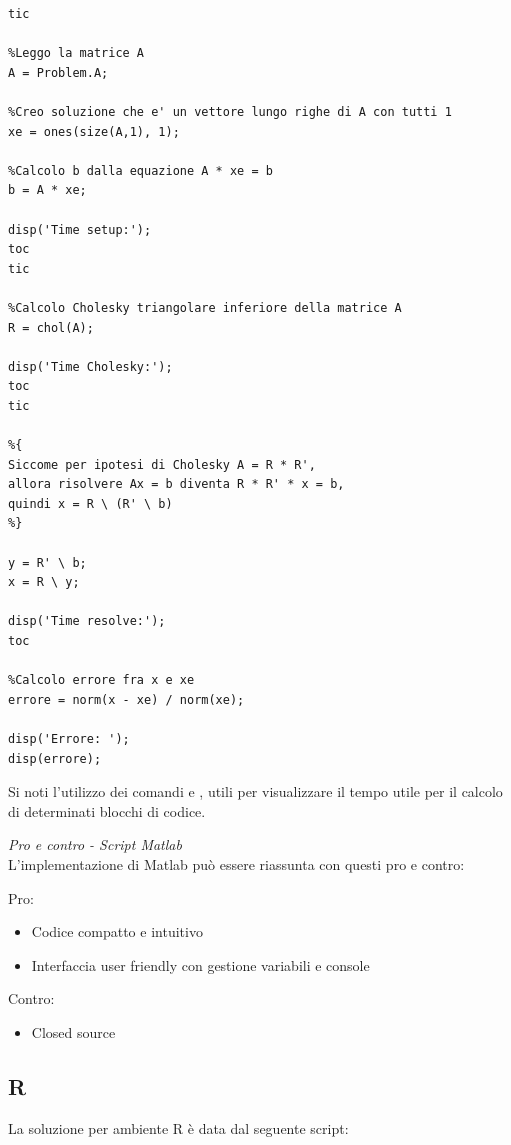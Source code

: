 \documentclass[preprint,12pt]{elsarticle}
\begin{document}
\begin{lstlisting}
tic

%Leggo la matrice A
A = Problem.A;

%Creo soluzione che e' un vettore lungo righe di A con tutti 1
xe = ones(size(A,1), 1);

%Calcolo b dalla equazione A * xe = b
b = A * xe;

disp('Time setup:');
toc
tic

%Calcolo Cholesky triangolare inferiore della matrice A 
R = chol(A);

disp('Time Cholesky:');
toc
tic

%{
Siccome per ipotesi di Cholesky A = R * R',
allora risolvere Ax = b diventa R * R' * x = b,
quindi x = R \ (R' \ b)
%}

y = R' \ b;
x = R \ y;

disp('Time resolve:');
toc

%Calcolo errore fra x e xe
errore = norm(x - xe) / norm(xe);

disp('Errore: ');
disp(errore);

\end{lstlisting}

Si noti l'utilizzo dei comandi  e , utili per visualizzare il tempo utile per il calcolo di determinati blocchi di codice.\\


\medskip

\textit{Pro e contro - Script Matlab}\\
\vspace{4mm}
L'implementazione di Matlab può essere riassunta con questi pro e contro:

Pro:
\begin{itemize}
	\item Codice compatto e intuitivo
	\item Interfaccia user friendly con gestione variabili e console
\end{itemize}

Contro:
\begin{itemize}
	\item Closed source
\end{itemize}

\newpage

\subsection*{R}

La soluzione per ambiente R è data dal seguente script:
\end{document}
